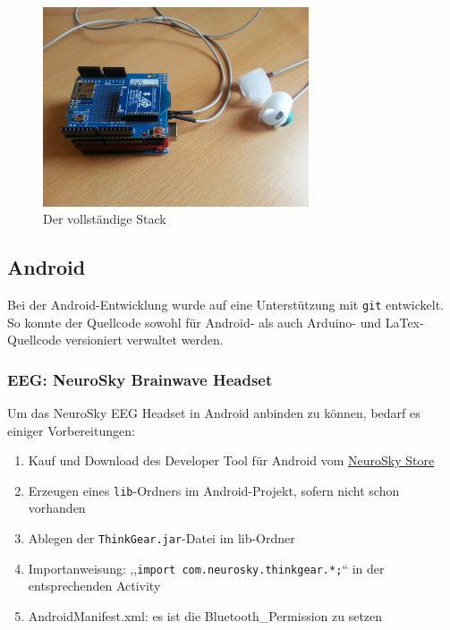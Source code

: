 \documentclass[10pt, a4paper, oneside, titlepage]{scrartcl} %
\begin{document}
	\begin{figure}[hbtp]
	\centering
	\includegraphics[width=0.7\textwidth]{implementierung_completestack.jpg}
	\caption{Der vollständige Stack}
	\label{fig:completeStack}
	\end{figure}
	
	
	\newpage
	\subsection{Android}
	
	Bei der Android-Entwicklung wurde auf eine Unterstützung mit \texttt{git} entwickelt. So konnte der Quellcode sowohl für Android- als auch Arduino- und LaTex-Quellcode versioniert verwaltet werden.
	
	\subsubsection{EEG: NeuroSky Brainwave Headset}
	
	Um das NeuroSky EEG Headset in Android anbinden zu können, bedarf es einiger Vorbereitungen:
	\begin{enumerate}
	\item Kauf und Download des Developer Tool für Android vom \href{http://store.neurosky.com/products/developer-tools-3-android} {NeuroSky Store}
	\item Erzeugen eines \texttt{lib}-Ordners im Android-Projekt, sofern nicht schon vorhanden
	\item Ablegen der \texttt{ThinkGear.jar}-Datei im lib-Ordner
	\item Importanweisung: ,,\texttt{import com.neurosky.thinkgear.*;}`` in der entsprechenden Activity
	\item AndroidManifest.xml: es ist die Bluetooth\_Permission zu setzen
	\end{enumerate}
	
\end{document}
